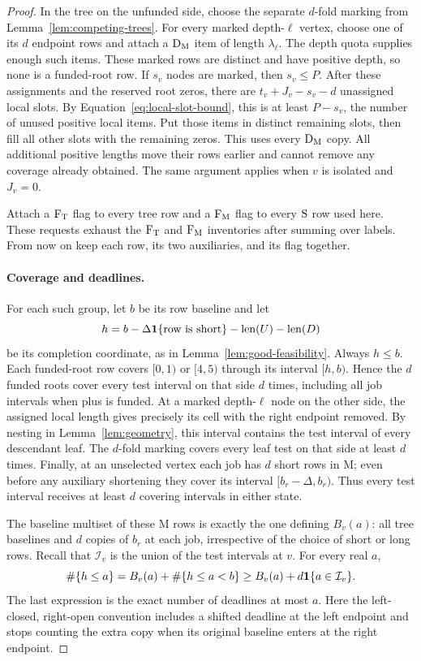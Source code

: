 \begin{proof}
In the tree on the unfunded side, choose the separate $d$-fold
marking from Lemma~\ref{lem:competing-trees}.  For every marked
depth-$\ell$ vertex, choose one of its $d$ endpoint rows and attach
a $\mathrm{D}_{\mathrm M}$ item of length $\lambda_\ell$.  The depth quota supplies
enough such items.  These marked rows are distinct and have positive
depth, so none is a funded-root row.  If $s_v$ nodes are marked, then
$s_v\le P$.  After these assignments and the reserved root zeros,
there are $t_v+J_v-s_v-d$ unassigned local slots.  By
Equation~\eqref{eq:local-slot-bound}, this is at least $P-s_v$, the
number of unused positive local items.  Put those items in distinct
remaining slots, then fill all other slots with the remaining zeros.
This uses every $\mathrm{D}_{\mathrm M}$ copy.  All additional positive lengths move
their rows earlier and cannot remove any coverage already obtained.
The same argument applies when $v$ is isolated and $J_v=0$.

Attach a $\mathrm{F}_{\mathrm T}$ flag to every tree row and a $\mathrm{F}_{\mathrm M}$ flag to every
$\mathrm{S}$ row used here.  These requests exhaust the $\mathrm{F}_{\mathrm T}$ and $\mathrm{F}_{\mathrm M}$ inventories
after summing over labels.  From now on keep each row, its two
auxiliaries, and its flag together.

\paragraph{Coverage and deadlines.}
For each such group, let $b$ be its row baseline and let
\[
 h=b-\Delta\mathbf{1}\{\text{row is short}\}
      -\operatorname{len}(U)-\operatorname{len}(D)
\]
be its completion coordinate, as in
Lemma~\ref{lem:good-feasibility}.  Always $h\le b$.
Each funded-root row covers $[0,1)$ or $[4,5)$ through its interval
$[h,b)$.  Hence the $d$ funded roots cover every test interval on
that side $d$ times, including all job intervals when plus is funded.
At a marked depth-$\ell$ node on the other side, the assigned local
length gives precisely its cell with the right endpoint removed.
By nesting in Lemma~\ref{lem:geometry}, this interval contains the
test interval of every descendant leaf.  The $d$-fold marking covers every leaf test on that
side at least $d$ times.  Finally, at an unselected vertex each job
has $d$ short rows in $\mathrm M$; even before any auxiliary
shortening they cover its interval $[b_r-\Delta,b_r)$.
Thus every test interval receives at least $d$ covering intervals
in either state.

The baseline multiset of these $\mathrm M$ rows is exactly the one
defining $B_v(a)$: all tree baselines and $d$ copies of $b_r$ at
each job, irrespective of the choice of short or long rows.
Recall that $\mathcal I_v$ is the union of the test intervals at $v$.
For every real $a$,
\begin{equation}\label{eq:complete-prefix}
 \#\{h\le a\}
 =B_v(a)+\#\{h\le a<b\}
 \ge B_v(a)+d\mathbf{1}\{a\in\mathcal I_v\}.
\end{equation}
The last expression is the exact number of deadlines at most $a$.
Here the left-closed, right-open convention includes a shifted
deadline at the left endpoint and stops counting the extra copy
when its original baseline enters at the right endpoint.


\end{proof}

